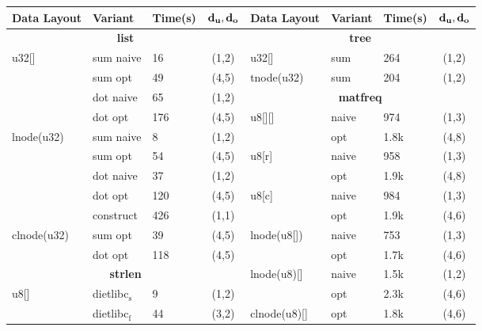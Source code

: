 \begin{figure}[H]
\begin{scriptsize}
\begin{tabular}{@{}l@{\hspace{5px}}l@{\hspace{5px}}l@{\hspace{5px}}cl@{\hspace{5px}}l@{\hspace{5px}}l@{\hspace{5px}}c@{}}
\toprule
{\bf Data Layout} & {\bf Variant} & {\bf Time(s)} & {\bf ${\tt \bf d_u,d_o}$} & {\bf Data Layout} & {\bf Variant} & {\bf Time(s)} & {\bf ${\tt \bf d_u,d_o}$} \\
\midrule
\multicolumn{4}{c}{\bf list} &                               \multicolumn{4}{c}{\bf tree} \\
u32[] & sum naive & 16 & (1,2) &                             u32[] & sum & 264 & (1,2) \\
      & sum opt & 49 & (4,5) &                               tnode(u32) & sum & 204 & (1,2) \\
      & dot naive & 65 & (1,2) &                             \multicolumn{4}{c}{\bf matfreq} \\
      & dot opt & 176 & (4,5) &                              u8[][] & naive & 974 & (1,3) \\
lnode(u32) & sum naive & 8 & (1,2) &                         & opt & 1.8k & (4,8) \\
           & sum opt & 54 & (4,5) &                          u8[r] & naive & 958 & (1,3) \\
           & dot naive & 37 & (1,2) &                        & opt & 1.9k & (4,8) \\
           & dot opt & 120 & (4,5) &                         u8[c] & naive & 984 & (1,3) \\
           & construct & 426 & (1,1) &                       & opt & 1.9k & (4,6) \\
clnode(u32) & sum opt & 39 & (4,5) &                         lnode(u8[]) & naive & 753 & (1,3) \\
            & dot opt & 118 & (4,5) &                        & opt & 1.7k & (4,6) \\
\multicolumn{4}{c}{\bf strlen}   &                           lnode(u8)[] & naive & 1.5k & (1,2) \\
u8[] & dietlibc$\mathrm{_{s}}$ & 9 & (1,2) &             & opt & 2.3k & (4,6) \\
       & dietlibc$\mathrm{_{f}}$ & 44 & (3,2) &           clnode(u8)[] & opt & 1.8k & (4,6) \\

\end{tabular}
\end{scriptsize}
\end{figure}
